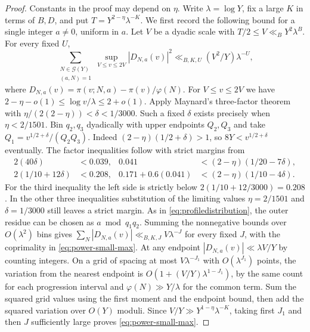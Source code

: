 \documentclass[11pt,a4paper]{article}
\numberwithin{equation}{section}
\begin{document}
\begin{proof}
Constants in the proof may depend on $\eta$. Write $\lambda=\log Y$,
fix a large $K$ in terms of $B,D$, and put
$T=Y^{2-\eta}\lambda^{-K}$. We first record the following bound
for a single integer $a\ne0$, uniform in $a$. Let $V$ be a dyadic
scale with $T/2\le V\ll_B Y^2\lambda^B$. For every fixed $U$,
\begin{equation}
 \sum_{\substack{N\in\mathcal G(Y)\\(a,N)=1}}
 \sup_{V\le v\le 2V}|D_{N,a}(v)|^2
       \ll_{B,K,U} (V^2/Y)\lambda^{-U},
 \label{eq:power-small-max}
\end{equation}
where $D_{N,a}(v)=\pi(v;N,a)-\pi(v)/\varphi(N)$.
For $V\le v\le2V$ we have
$2-\eta-o(1)\le\log v/\lambda\le2+o(1)$. Apply Maynard's
three-factor theorem \cite[Theorem~1.2]{MaynardIII} with
$\eta/(2(2-\eta))<\delta<1/3000$. Such a fixed $\delta$
exists precisely when $\eta<2/1501$. Bin $q_2,q_3$ dyadically with upper endpoints
$Q_2,Q_3$ and take $Q_1=v^{1/2+\delta}/(Q_2Q_3)$.
Indeed $(2-\eta)(1/2+\delta)>1$, so $8Y<v^{1/2+\delta}$
eventually. The factor inequalities follow with strict margins from
\begin{align*}
 2(40\delta)&<0.039, &
 0.041&<(2-\eta)(1/20-7\delta),\\
 2(1/10+12\delta)&<0.208, &
 0.171+0.6(0.041)&<(2-\eta)(1/10-4\delta).
\end{align*}
For the third inequality the left side is strictly below
$2(1/10+12/3000)=0.208$. In the other three inequalities
substitution of the limiting values $\eta=2/1501$ and
$\delta=1/3000$ still leaves a strict margin.
As in \cref{eq:profiledistribution}, the outer residue can be
chosen as $a\bmod q_1q_2$. Summing the nonnegative bounds over
$O(\lambda^2)$ bins gives $\sum_N |D_{N,a}(v)|\ll_{B,K,J}
V\lambda^{-J}$ for every fixed $J$, with the coprimality in
\cref{eq:power-small-max}. At any endpoint $|D_{N,a}(v)|
\ll \lambda V/Y$ by counting integers. On a grid of spacing
at most $V\lambda^{-J_1}$ with $O(\lambda^{J_1})$ points,
the variation from the nearest endpoint is
$O(1+(V/Y)\lambda^{1-J_1})$, by the same count for each
progression interval and $\varphi(N)\gg Y/\lambda$ for the
common term. Sum the squared grid values using the first
moment and the endpoint bound, then add the squared variation
over $O(Y)$ moduli. Since $V/Y\gg Y^{1-\eta}\lambda^{-K}$,
taking first $J_1$ and then $J$ sufficiently large proves
\cref{eq:power-small-max}.


\end{proof}
\end{document}
